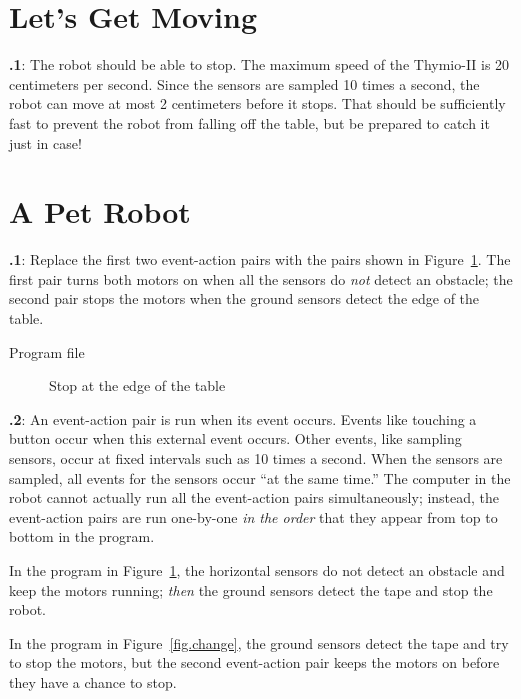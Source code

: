\documentclass[12pt,a4paper,english]{article}
\begin{document}
\section{Let's Get Moving}

\textbf{\thesection.1}: The robot should be able to stop. The
maximum speed of the Thymio-II is 20 centimeters per second. Since the
sensors are sampled 10 times a second, the robot can move at most 2
centimeters before it stops. That should be sufficiently fast to prevent
the robot from falling off the table, but be prepared to catch it just
in case!


\section{A Pet Robot}

\textbf{\thesection.1}: Replace the first two event-action pairs
with the pairs shown in Figure~\ref{fig.answer1}. The first pair turns
both motors on when all the sensors do \emph{not} detect an obstacle;
the second pair stops the motors when the ground sensors detect the edge
of the table.

{\raggedleft \hfill Program file }

\begin{figure}[hbt]
\begin{center}
\caption{Stop at the edge of the table}\label{fig.answer1}
\end{center}
\end{figure}

\textbf{\thesection.2}: An event-action pair is run when its event
occurs. Events like touching a button occur when this external event
occurs. Other events, like sampling sensors, occur at fixed intervals
such as 10 times a second. When the sensors are sampled, all events for
the sensors occur ``at the same time.'' The computer in the robot cannot
actually run all the event-action pairs simultaneously; instead, the
event-action pairs are run one-by-one \emph{in the order} that they
appear from top to bottom in the program.

In the program in Figure~\ref{fig.answer1}, the horizontal sensors
do not detect an obstacle and keep the motors running; \emph{then} the
ground sensors detect the tape and stop the robot.

In the program in Figure~\ref{fig.change}, the ground sensors
detect the tape and try to stop the motors, but the second event-action
pair keeps the motors on before they have a chance to stop.
\end{document}
